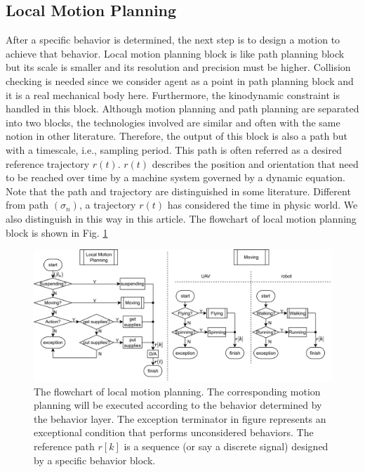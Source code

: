 \documentclass{ieeeaccess}
\begin{document}
\subsection{Local Motion Planning}
After a specific behavior is determined, the next step is to design a motion to achieve that behavior. Local motion planning block is like path planning block but its scale is smaller and its resolution and precision must be higher. Collision checking is needed since we consider agent as a point in path planning block and it is a real mechanical body here. Furthermore, the kinodynamic constraint is handled in this block. Although motion planning and path planning are separated into two blocks, the technologies involved are similar and often with the same notion in other literature. Therefore, the output of this block is also a path but with a timescale, i.e., sampling period. This path is often referred as a desired reference trajectory $r(t)$. $r(t)$ describes the position and orientation that need to be reached over time by a machine system governed by a dynamic equation. Note that the path and trajectory are distinguished in some literature. Different from path $(\sigma_n)$, a trajectory $r(t)$ has considered the time in physic world. We also distinguish in this way in this article. The flowchart of local motion planning block is shown in Fig. \ref{fig:LocalMotionPlanning}
\begin{figure}[htbp]
    \centering
    \includegraphics[scale=.4]{fig/LMP.pdf}\caption{The flowchart of local motion planning. The corresponding motion planning will be executed according to the behavior determined by the behavior layer. The exception terminator in figure represents an exceptional condition that performs unconsidered behaviors. The reference path $r[k]$ is a sequence (or say a discrete signal) designed by a specific behavior block.}
    \label{fig:LocalMotionPlanning}
\end{figure}
\end{document}
